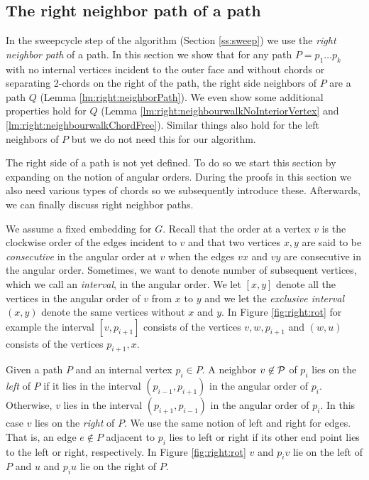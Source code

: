 
\subsection{The right neighbor path of a path}
\thispagestyle{plain}
  \label{ss:rightNeighbour}
  In the sweepcycle step of the algorithm (Section \ref{ss:sweep}) we use the \emph{right neighbor path} of a path. In this section we show that for any path $P = p_1 \ldots p_k$ with no internal vertices incident to the outer face and without chords or separating 2-chords on the right of the path, the right side neighbors of $P$ are a path $Q$ (Lemma \ref{lm:right:neighborPath}).
  We even show some additional properties hold for $Q$ (Lemma  \ref{lm:right:neighbourwalkNoInteriorVertex} and \ref{lm:right:neighbourwalkChordFree}).
  Similar things also hold for the left neighbors of $P$ but we do not need this for our algorithm.

  The right side of a path is not yet defined. To do so we start this section by expanding on the notion of angular orders. During the proofs in this section we also need various types of chords so we subsequently introduce these. Afterwards, we can finally discuss right neighbor paths.

    We assume a fixed embedding for $G$. Recall that the order at a vertex $v$ is the clockwise order of the edges incident to $v$ and that two vertices $x, y$ are said to be \emph{consecutive} in the angular order at $v$ when the edges $vx$ and $vy$ are consecutive in the angular order.
    Sometimes, we want to denote number of subsequent vertices, which we call an \emph{interval}, in the angular order. We let $[x,y]$ denote all the vertices in the angular order of $v$ from $x$ to $y$ and we let the \emph{exclusive interval} $(x,y)$ denote the same vertices without $x$ and $y$. In Figure \ref{fig:right:rot} for example the interval $[v,p_{i+1}]$ consists of the vertices $v,w,p_{i+1}$ and $(w,u)$ consists of the vertices $p_{i+1}, x$.

    Given a path $P$ and an internal vertex $p_i \in P$. A neighbor $v \not \in \mathcal{P}$ of $p_i$ lies on the \emph{left} of $P$ if it lies in the interval $(p_{i-1}, p_{i+1})$ in the angular order of $p_{i}$. Otherwise, $v$ lies in the interval $(p_{i+1}, p_{i-1})$ in the angular order of $p_i$. In this case $v$ lies on the \emph{right} of $P$.
    We use the same notion of left and right for edges. That is, an edge $e\nin P$ adjacent to $p_i$ lies to left or right if its other end point lies to the left or right, respectively. In Figure \ref{fig:right:rot} $v$ and $p_i v$ lie on the left of $P$ and $u$ and $p_i u$ lie on the right of $P$.

